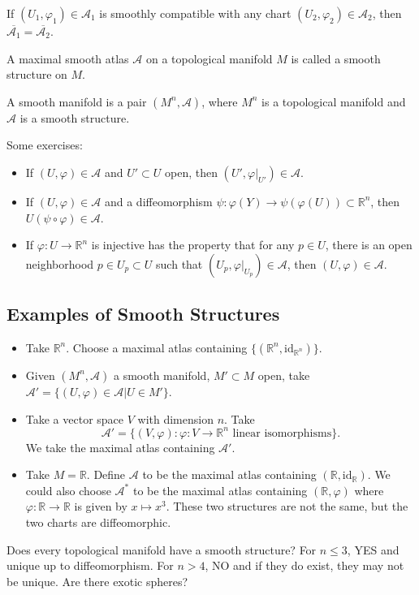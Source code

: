 \documentclass[12pt]{scrartcl}
\newcommand{\R}{\mathbb{R}}
\let \phi \varphi
\let \mc \mathcal
\let \ol \overline
\begin{document}
\begin{remark} If $(U_1, \phi_1) \in \mc A_1$ is smoothly compatible with any chart $(U_2, \phi_2) \in \mc A_2$, then $\ol{\mc A_1} = \ol{\mc A_2}$.
\end{remark}
\begin{definition} A maximal smooth atlas $\mc A$ on a topological manifold $M$ is called a smooth structure on $M$.
\end{definition}
\begin{definition} A smooth manifold is a pair $(M^n, \mc A)$, where $M^n$ is a topological manifold and $\mc A$ is a smooth structure.  
\end{definition}
Some exercises:
\begin{itemize}
\item If $(U, \phi) \in \mc A$ and $U' \subset U$ open, then $(U', \phi\vert_{U'}) \in \mc A$.
\item If $(U, \phi) \in \mc A$ and a diffeomorphism $\psi: \phi(Y) \to \psi(\phi(U)) \subset \R^n $, then $U(\psi \circ \phi) \in \mc A$.
\item If $\phi: U \to \R^n$ is injective has the property that for any $p \in U$, there is an open neighborhood $p \in U_p \subset U$ such that $(U_p, \phi \vert_{U_p})\in \mc A$, then $(U, \phi) \in \mc A$.
\end{itemize}
\subsection{Examples of Smooth Structures}
\begin{itemize}
\item Take $\R^n$.  Choose a maximal atlas containing $\{(\R^n, \text{id}_{\R^n})\}$.  
\item  Given $(M^n, \mc A)$ a smooth manifold, $M' \subset M$ open, take $\mc A' = \{(U, \phi) \in \mc A | U \in M'\}$.  
\item Take a vector space $V$ with dimension $n$.  Take $$\mc A' = \{(V, \phi) : \phi: V \to \R^n \text{ linear isomorphisms}\}.$$
We take the maximal atlas containing $\mc A'$.
\item Take $M = \R$.  Define $\mc A$ to be the maximal atlas containing $(\R, \text{id}_\R)$.  We could also choose $\mc A^*$ to be the maximal atlas containing $(\R, \phi)$ where $\phi: \R \to \R$ is given by $x \mapsto x^3$.  These two structures are not the same, but the two charts are diffeomorphic.  
\end{itemize}
Does every topological manifold have a smooth structure?  For $n \le 3$, YES and unique up to diffeomorphism.  For $n > 4$, NO and if they do exist, they may not be unique.  Are there exotic spheres?
\pagebreak
\end{document}
